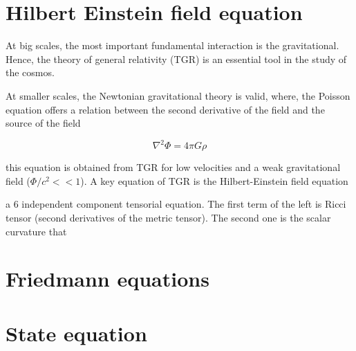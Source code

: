 \section{Hilbert Einstein field equation}

At big scales, the most important fundamental interaction is the 
gravitational. Hence, the theory of general relativity (TGR) is 
an essential tool in the study of the cosmos. 

At smaller scales, the Newtonian gravitational theory is valid, where, 
the Poisson equation offers a relation between the second derivative
of the field and the source of the field 

\[ \nabla^2\Phi=4\pi G\rho\]

this equation is obtained from TGR for low velocities and 
a weak gravitational field ($\Phi/c^2<< 1$). A key equation of TGR is
the Hilbert-Einstein field equation



a 6 independent component tensorial equation. The first term of the left
is Ricci tensor (second derivatives of the metric tensor). The second one 
is the scalar curvature that 

	

\section{ Friedmann equations }



\section{ State equation }




